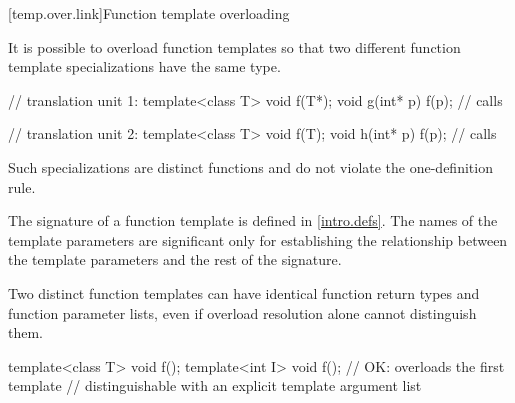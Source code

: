 [temp.over.link]{Function template overloading}

\pnum
{}%
It is possible to overload function templates so that two different
function template specializations have the same type.
\begin{example}

\begin{minipage}{.45\hsize}
\begin{codeblock}
// translation unit 1:
template<class T>
  void f(T*);
void g(int* p) {
  f(p); // calls 
}
\end{codeblock}
\end{minipage}
\begin{minipage}{.45\hsize}
\begin{codeblock}
// translation unit 2:
template<class T>
  void f(T);
void h(int* p) {
  f(p); // calls 
}
\end{codeblock}
\end{minipage}

\end{example}

\pnum
Such specializations are distinct functions and do not violate the one-definition
rule.

\pnum
The signature of a function template
is defined in \ref{intro.defs}.
The names of the template parameters are significant only for establishing
the relationship between the template parameters and the rest of the
signature.
\begin{note}
Two distinct function templates can have identical function return types and
function parameter lists, even if overload resolution alone cannot distinguish
them.

\begin{codeblock}
template<class T> void f();
template<int I> void f();       // OK: overloads the first template
                                // distinguishable with an explicit template argument list
\end{codeblock}
\end{note}


